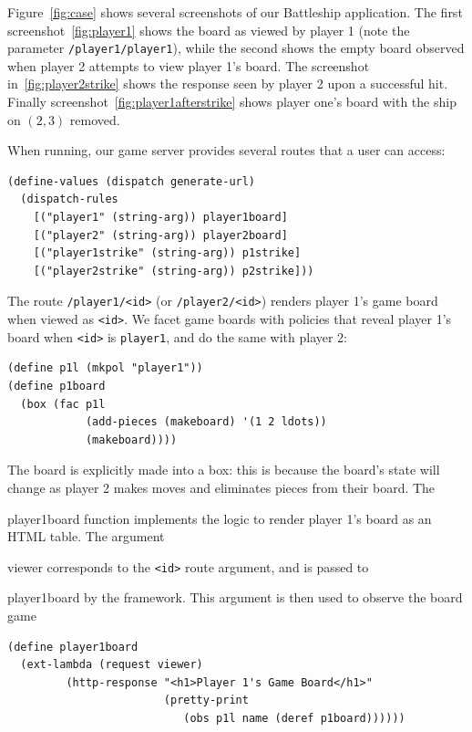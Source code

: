 \documentclass[review=true,acmlarge]{acmart}
\newcommand*{\SavedLstInline}{}
\DeclareRobustCommand*{\lstinline}{%
  \ifmmode
    \let\SavedBGroup\bgroup
    \def\bgroup{%
      \let\bgroup\SavedBGroup
      \hbox\bgroup
    }%
  \fi
  \SavedLstInline
}
\newcommand{\colorMATH}{black!20!blue}
\newcommand{\bmth}[1] {{\color{\colorMATH} $#1$}}
\newcommand{\code}[1]{\lstinline{#1}}
\begin{document}
Figure~\ref{fig:case} shows several screenshots of our Battleship
application. The first screenshot~\ref{fig:player1} shows the board as
viewed by player 1 (note the parameter \texttt{/player1/player1}),
while the second shows the empty board observed when player 2 attempts
to view player 1's board. The screenshot in~\ref{fig:player2strike}
shows the response seen by player 2 upon a successful hit. Finally
screenshot~\ref{fig:player1afterstrike} shows player one's board with
the ship on \bmth{(2,3)} removed.

When running, our game server provides several routes that a user can
access:

\begin{lstlisting}[language=Racket,escapechar=|,name=case]
(define-values (dispatch generate-url)
  (dispatch-rules
    [("player1" (string-arg)) player1board]
    [("player2" (string-arg)) player2board]
    [("player1strike" (string-arg)) p1strike]
    [("player2strike" (string-arg)) p2strike]))
\end{lstlisting}

The route \texttt{/player1/<id>} (or \texttt{/player2/<id>}) renders
player 1's game board when viewed as \texttt{<id>}. We facet game
boards with policies that reveal player 1's board when \texttt{<id>}
is \texttt{player1}, and do the same with player 2:

\begin{lstlisting}[language=Racket,escapechar=|,name=case]
(define p1l (mkpol "player1"))
(define p1board
  (box (fac p1l
            (add-pieces (makeboard) '(1 2 ldots))
            (makeboard))))
\end{lstlisting}

The board is explicitly made into a box: this is because the board's
state will change as player 2 makes moves and eliminates pieces from
their board. The \code{player1board} function implements the logic to
render player 1's board as an HTML table. The argument \code{viewer}
corresponds to the \texttt{<id>} route argument, and is passed to
\code{player1board} by the framework. This argument is then used to
observe the board game

\begin{lstlisting}[language=Racket,escapechar=|,name=case]
(define player1board
  (ext-lambda (request viewer)
         (http-response "<h1>Player 1's Game Board</h1>"
                        (pretty-print 
                           (obs p1l name (deref p1board))))))
\end{lstlisting}
\end{document}
